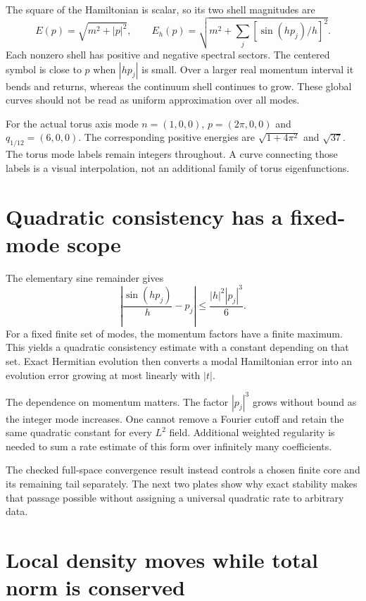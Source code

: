 The square of the Hamiltonian is scalar, so its two shell magnitudes are
\[
E(p)=\sqrt{m^2+|p|^2},\qquad
E_h(p)=\sqrt{m^2+\sum_j[\sin(hp_j)/h]^2}.
\]
Each nonzero shell has positive and negative spectral sectors. The centered symbol is close to $p$ when $|hp_j|$ is small. Over a larger real momentum interval it bends and returns, whereas the continuum shell continues to grow. These global curves should not be read as uniform approximation over all modes.

For the actual torus axis mode $n=(1,0,0)$, $p=(2\pi,0,0)$ and $q_{1/12}=(6,0,0)$. The corresponding positive energies are $\sqrt{1+4\pi^2}$ and $\sqrt{37}$. The torus mode labels remain integers throughout. A curve connecting those labels is a visual interpolation, not an additional family of torus eigenfunctions.


\clearpage
\section{Quadratic consistency has a fixed-mode scope}

The elementary sine remainder gives
\[
\left|\frac{\sin(hp_j)}{h}-p_j\right|
\leq \frac{|h|^2|p_j|^3}{6}.
\]
For a fixed finite set of modes, the momentum factors have a finite maximum. This yields a quadratic consistency estimate with a constant depending on that set. Exact Hermitian evolution then converts a modal Hamiltonian error into an evolution error growing at most linearly with $|t|$.

The dependence on momentum matters. The factor $|p_j|^3$ grows without bound as the integer mode increases. One cannot remove a Fourier cutoff and retain the same quadratic constant for every $L^2$ field. Additional weighted regularity is needed to sum a rate estimate of this form over infinitely many coefficients.

The checked full-space convergence result instead controls a chosen finite core and its remaining tail separately. The next two plates show why exact stability makes that passage possible without assigning a universal quadratic rate to arbitrary data.


\clearpage
\section{Local density moves while total norm is conserved}

